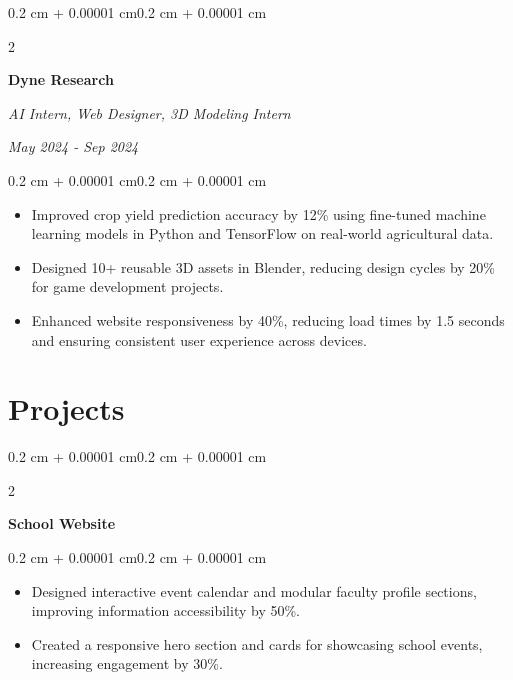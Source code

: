 \documentclass[10pt, letterpaper]{article}
\newenvironment{highlights}{
    \begin{itemize}[topsep=0.10 cm, parsep=0.10 cm, partopsep=0pt, itemsep=0pt, leftmargin=0.4 cm + 10pt]
}{
    \end{itemize}
}
\newenvironment{onecolentry}{
    \begin{adjustwidth}{0.2 cm + 0.00001 cm}{0.2 cm + 0.00001 cm}
}{
    \end{adjustwidth}
}
\newenvironment{twocolentry}[2][]{
    \onecolentry
    \def\secondColumn{#2}
    \setcolumnwidth{\fill, 4.5 cm}
    \begin{paracol}{2}
}{
    \switchcolumn \raggedleft \secondColumn
    \end{paracol}
    \endonecolentry
}
\let\hrefWithoutArrow\href
\renewcommand{\href}[2]{\hrefWithoutArrow{#1}{\ifthenelse{\equal{#2}{}}{ }{#2 }\raisebox{.15ex}{\footnotesize \faExternalLink*}}}
\begin{document}
        \vspace{0.2 cm}
        \begin{twocolentry}{
            \textit{May 2024 - Sep 2024}}
            \textbf{Dyne Research}

            \textit{AI Intern, Web Designer, 3D Modeling Intern}
        \end{twocolentry}
        \vspace{0.10 cm}
        \begin{onecolentry}
            \begin{highlights}
                \item Improved crop yield prediction accuracy by 12\% using fine-tuned machine learning models in Python and TensorFlow on real-world agricultural data.
                \item Designed 10+ reusable 3D assets in Blender, reducing design cycles by 20\% for game development projects.
                \item Enhanced website responsiveness by 40\%, reducing load times by 1.5 seconds and ensuring consistent user experience across devices.
            \end{highlights}
        \end{onecolentry}

    \section{Projects}
        \begin{twocolentry}{
            \textit{\href{https://github.com/Keerthivasan-Venkitajalam/school-website}{GitHub}}}
            \textbf{School Website}
        \end{twocolentry}
        \vspace{0.10 cm}
        \begin{onecolentry}
            \begin{highlights}
                \item Designed interactive event calendar and modular faculty profile sections, improving information accessibility by 50\%.
                \item Created a responsive hero section and cards for showcasing school events, increasing engagement by 30\%.
            \end{highlights}
        \end{onecolentry}
        
\end{document}
